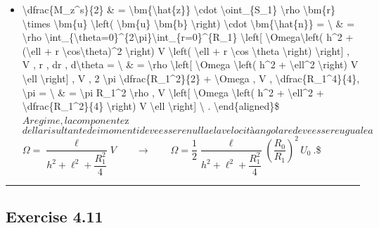 \documentclass[letterpaper,10pt,italian]{jupyterBook}
\begin{document}
\begin{itemize}
\item {} 
\sphinxAtStartPar
\textbackslash{}dfrac\{M\_z\textasciicircum{}s\}\{2\} \& = \textbackslash{}bm\{\textbackslash{}hat\{z\}\} \textbackslash{}cdot \textbackslash{}oint\_\{S\_1\} \textbackslash{}rho \textbackslash{}bm\{r\} \textbackslash{}times \textbackslash{}bm\{u\} \textbackslash{}left( \textbackslash{}bm\{u\} \sphinxhyphen{} \textbackslash{}bm\{b\} \textbackslash{}right) \textbackslash{}cdot \textbackslash{}bm\{\textbackslash{}hat\{n\}\} = \textbackslash{}
\& = \textbackslash{}rho \textbackslash{}int\_\{\textbackslash{}theta=0\}\textasciicircum{}\{2\textbackslash{}pi\}\textbackslash{}int\_\{r=0\}\textasciicircum{}\{R\_1\}
\textbackslash{}left{[} \textbackslash{}Omega\textbackslash{}left( h\textasciicircum{}2 + (\textbackslash{}ell + r \textbackslash{}cos\textbackslash{}theta)\textasciicircum{}2 \textbackslash{}right) \sphinxhyphen{} V \textbackslash{}left( \textbackslash{}ell + r \textbackslash{}cos \textbackslash{}theta \textbackslash{}right)  \textbackslash{}right{]} , V ,  r , dr , d\textbackslash{}theta = \textbackslash{}
\& = \textbackslash{}rho \textbackslash{}left{[} \textbackslash{}Omega \textbackslash{}left( h\textasciicircum{}2 + \textbackslash{}ell\textasciicircum{}2 \textbackslash{}right) \sphinxhyphen{} V \textbackslash{}ell \textbackslash{}right{]} , V , 2 \textbackslash{}pi \textbackslash{}dfrac\{R\_1\textasciicircum{}2\}\{2\} +
\textbackslash{}Omega , V , \textbackslash{}dfrac\{R\_1\textasciicircum{}4\}\{4\}, \textbackslash{}pi = \textbackslash{}
\& = \textbackslash{}pi R\_1\textasciicircum{}2 \textbackslash{}rho , V \textbackslash{}left{[} \textbackslash{}Omega \textbackslash{}left( h\textasciicircum{}2 + \textbackslash{}ell\textasciicircum{}2 + \textbackslash{}dfrac\{R\_1\textasciicircum{}2\}\{4\} \textbackslash{}right) \sphinxhyphen{} V \textbackslash{}ell \textbackslash{}right{]} \textbackslash{} .
\textbackslash{}end\{aligned\}\$\( A regime, la componente \)z\( della risultante dei momenti
deve essere nulla e la velocità angolare deve essere uguale a
\)\(\Omega = \dfrac{\ell}{h^2 + \ell^2 + \dfrac{R_1^2}{4}} V
\qquad \rightarrow \qquad
\Omega = \dfrac{1}{2}\dfrac{\ell}{h^2 + \ell^2 + \dfrac{R_1^2}{4}} \left( \dfrac{R_0}{R_1} \right)^2 \, U_0 \ .\)\$

\end{itemize}


\bigskip\hrule\bigskip


\sphinxstepscope


\subsection{Exercise 4.11}
\label{\detokenize{polimi/fluidmechanics-ita/template/capitoli/04_bilanci/04e01in:exercise-4-11}}\label{\detokenize{polimi/fluidmechanics-ita/template/capitoli/04_bilanci/04e01in:fluid-mechanics-balances-ex-11}}\label{\detokenize{polimi/fluidmechanics-ita/template/capitoli/04_bilanci/04e01in::doc}}
\end{document}
